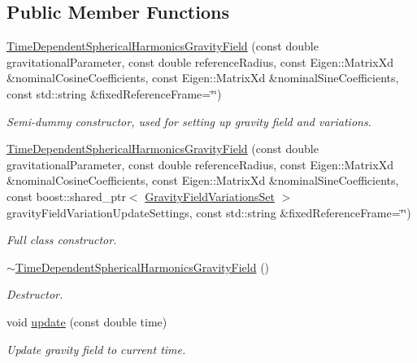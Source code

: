 \subsection*{Public Member Functions}
\begin{DoxyCompactItemize}
\item 
\hyperlink{classtudat_1_1gravitation_1_1TimeDependentSphericalHarmonicsGravityField_a70852ec08158ab1f56592b8d0452f5cf}{Time\+Dependent\+Spherical\+Harmonics\+Gravity\+Field} (const double gravitational\+Parameter, const double reference\+Radius, const Eigen\+::\+Matrix\+Xd \&nominal\+Cosine\+Coefficients, const Eigen\+::\+Matrix\+Xd \&nominal\+Sine\+Coefficients, const std\+::string \&fixed\+Reference\+Frame=\char`\"{}\char`\"{})
\begin{DoxyCompactList}\small\item\em Semi-\/dummy constructor, used for setting up gravity field and variations. \end{DoxyCompactList}\item 
\hyperlink{classtudat_1_1gravitation_1_1TimeDependentSphericalHarmonicsGravityField_ae8bc5b0f8af2a3b96fb96890bc04fbff}{Time\+Dependent\+Spherical\+Harmonics\+Gravity\+Field} (const double gravitational\+Parameter, const double reference\+Radius, const Eigen\+::\+Matrix\+Xd \&nominal\+Cosine\+Coefficients, const Eigen\+::\+Matrix\+Xd \&nominal\+Sine\+Coefficients, const boost\+::shared\+\_\+ptr$<$ \hyperlink{classtudat_1_1gravitation_1_1GravityFieldVariationsSet}{Gravity\+Field\+Variations\+Set} $>$ gravity\+Field\+Variation\+Update\+Settings, const std\+::string \&fixed\+Reference\+Frame=\char`\"{}\char`\"{})
\begin{DoxyCompactList}\small\item\em Full class constructor. \end{DoxyCompactList}\item 
\hyperlink{classtudat_1_1gravitation_1_1TimeDependentSphericalHarmonicsGravityField_ab72eb00152063353b3c5306f5a12c94e}{$\sim$\+Time\+Dependent\+Spherical\+Harmonics\+Gravity\+Field} ()
\begin{DoxyCompactList}\small\item\em Destructor. \end{DoxyCompactList}\item 
void \hyperlink{classtudat_1_1gravitation_1_1TimeDependentSphericalHarmonicsGravityField_a4ab10f4a9f2fb257df5b47e8b6c39fb9}{update} (const double time)
\begin{DoxyCompactList}\small\item\em Update gravity field to current time. \end{DoxyCompactList}\item 

\end{DoxyCompactItemize}
